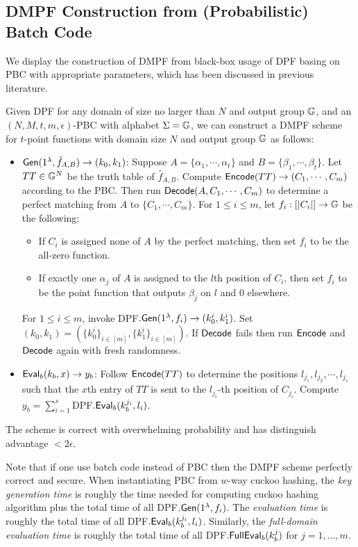 \subsection{DMPF Construction from (Probabilistic) Batch Code}
We display the construction of DMPF from black-box usage of DPF basing on PBC with appropriate parameters, which has been discussed in previous literature\cite{cryptoeprint:2019/273,cryptoeprint:2021/580}. 
\begin{construction}\label{con:DMPF_batch_code}
  Given DPF for any domain of size no larger than $N$ and output group $\mathbb{G}$, and an $(N,M,t,m,\epsilon)$-PBC with alphabet $\Sigma=\mathbb{G}$, we can construct a DMPF scheme for $t$-point functions with domain size $N$ and output group $\mathbb{G}$ as follows: 
  \begin{itemize}
    \item ${\sf Gen}(1^\lambda, \hat{f}_{A,B})\rightarrow (k_0,k_1)$: Suppose $A=\{\alpha_1,\cdots,\alpha_t\}$ and $B=\{\beta_1,\cdots,\beta_t\}$. Let $TT\in \mathbb{G}^N$ be the truth table of $\hat{f}_{A,B}$. Compute ${\sf Encode}(TT)\rightarrow (C_1,\cdots,C_m)$ according to the PBC. Then run ${\sf Decode}(A, C_1,\cdots, C_m)$ to determine a perfect matching from $A$ to $\{C_1,\cdots,C_m\}$. For $1\le i\le m$, let $f_i:[|C_i|]\rightarrow \mathbb{G}$ be the following: 
    \begin{itemize}
      \item If $C_i$ is assigned none of $A$ by the perfect matching, then set $f_i$ to be the all-zero function. 
      \item If exactly one $\alpha_j$ of $A$ is assigned to the $l$th position of $C_i$, then set $f_i$ to be the point function that outputs $\beta_j$ on $l$ and 0 elsewhere. 
    \end{itemize}
    For $1\le i\le m$, invoke DPF$.{\sf Gen}(1^\lambda, f_i)\rightarrow (k_0^i,k_1^i)$. Set $(k_0,k_1)=(\{k_0^i\}_{i\in [m]}, \{k_1^i\}_{i\in [m]})$. If ${\sf Decode}$ fails then run ${\sf Encode}$ and ${\sf Decode}$ again with fresh randomness. 
    \item ${\sf Eval}_b(k_b,x)\rightarrow y_b$: Follow ${\sf Encode}(TT)$ to determine the positions $l_{j_1},l_{j_2},\cdots, l_{j_s}$ such that the $x$th entry of $TT$ is sent to the $l_{j_i}$-th position of $C_{j_i}$. Compute $y_b=\sum_{i=1}^s$DPF$.{\sf Eval}_b(k_b^{j_i},l_i)$. 
  \end{itemize}
The scheme is correct with overwhelming probability and has distinguish advantage $<2\epsilon$. 
\end{construction}
Note that if one use batch code instead of PBC then the DMPF scheme perfectly correct and secure. When instantiating PBC from $w$-way cuckoo hashing, the \emph{key generation time} is roughly the time needed for computing cuckoo hashing algorithm plus the total time of all DPF$.{\sf Gen}(1^\lambda, f_i)$. The \emph{evaluation time} is roughly the total time of all DPF$.{\sf Eval}_b(k_b^{j_i},l_i)$. Similarly, the \emph{full-domain evaluation time} is roughly the total time of all DPF$.{\sf FullEval}_b(k_b^{j})$ for $j=1,\dots,m$. 

